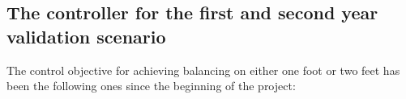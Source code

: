 \documentclass[12pt,a4paper,twoside]{article}
\begin{document}
%




\subsection{The controller for the first and second year validation scenario} 
\label{sec:firstSecondValid}
The control objective for achieving balancing on either one foot or two feet has been the following ones since the beginning of the project:
\begin{figure}[t]
\end{figure}
\end{document}

